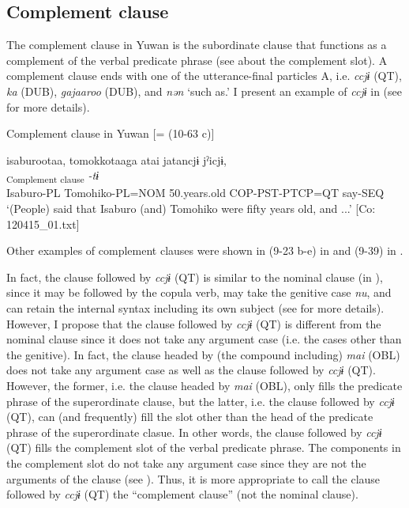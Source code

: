 \subsection{Complement clause}\label{sec:11.1.4}

The complement clause in Yuwan is the subordinate clause that functions as a complement of the verbal predicate phrase (see  about the complement slot). A complement clause ends with one of the utterance-final particles A, i.e. \textit{ccjɨ} (QT), \textit{ka} (DUB), \textit{gajaaroo} (DUB), and \textit{nən} ‘such as.’ I present an example of \textit{ccjɨ} in  (see  for more details).

\ea\label{ex:11-5}  Complement clause in Yuwan [= (10-63 c)]
  
      \glll    isaburootaa,  tomokkotaaga  atai  jatancjɨ   jˀicjɨ,\\
    [\textit{isaburoo-taa}  \textit{tomokko-taa=ga}  \textit{atai}  \textit{jar-tar-n=\Highlight{ccjɨ}}]\textsubscript{Complement clause}    \textit{-tɨ}\\
    Isaburo-PL  Tomohiko-PL=NOM  50.years.old  COP-PST-PTCP=QT  say-SEQ\\
    \glt ‘(People) said that Isaburo (and) Tomohiko were fifty years old, and ...’    [Co: 120415\_01.txt]
\z

Other examples of complement clauses were shown in (9-23 b-e) in  and (9-39) in .

In fact, the clause followed by \textit{ccjɨ} (QT) is similar to the nominal clause (in ), since it may be followed by the copula verb, may take the genitive case \textit{nu}, and can retain the internal syntax including its own subject (see  for more details). However, I propose that the clause followed by \textit{ccjɨ} (QT) is different from the nominal clause since it does not take any argument case (i.e. the cases other than the genitive). In fact, the clause headed by (the compound including) \textit{mai} (OBL) does not take any argument case as well as the clause followed by \textit{ccjɨ} (QT). However, the former, i.e. the clause headed by \textit{mai} (OBL), only fills the predicate phrase of the superordinate clause, but the latter, i.e. the clause followed by \textit{ccjɨ} (QT), can (and frequently) fill the slot other than the head of the predicate phrase of the superordinate clasue. In other words, the clause followed by \textit{ccjɨ} (QT) fills the complement slot of the verbal predicate phrase. The components in the complement slot do not take any argument case since they are not the arguments of the clause (see ). Thus, it is more appropriate to call the clause followed by \textit{ccjɨ} (QT) the “complement clause” (not the nominal clause).

